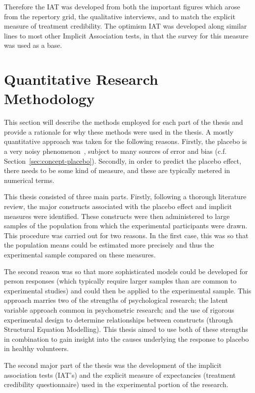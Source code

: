 Therefore the IAT was developed from both the important figures which arose from the repertory grid, the qualitative interviews, and to match the explicit measure of treatment credibility. The optimism IAT was developed along similar lines to most other Implicit Association tests, in that the survey for this measure was used as a base. 


\section{Quantitative Research Methodology}
\label{sec:quant-rese-meth}
This section  will describe the methods employed for each part of the thesis and provide a rationale for why these methods were used in the thesis.
A mostly quantitative approach was taken for the following reasons. Firstly, the placebo  is a very noisy phenomenon~\cite{Singer2005}, subject to many sources of error and bias (c.f. Section~\ref{sec:concept-placebo}). Secondly, in order to predict the placebo effect, there needs to be some kind of measure, and these are typically metered in numerical terms. 

This thesis consisted of three main parts. Firstly, following a thorough literature review, the major constructs associated with the placebo effect and implicit measures were identified. These constructs were then administered to large samples of the population from which the experimental participants were drawn. This procedure was carried out for two reasons. In the first case, this was so that the population means could be estimated more precisely and thus the experimental sample compared on these measures.  

The second reason was so that more sophisticated models could be developed for person responses (which typically require larger samples than are common to experimental studies) and could then be applied to the experimental sample. This approach marries two of the strengths of psychological research; the latent variable approach common in psychometric research; and  the use of rigorous experimental design to determine relationships between constructs (through Structural Equation Modelling). This thesis aimed to use both of these strengths in combination to gain insight into the causes underlying the response to placebo in healthy volunteers.

The second major part of the thesis was the development of the implicit association tests (IAT's) and the explicit measure of expectancies (treatment credibility questionnaire) used in the experimental portion of the research. 

